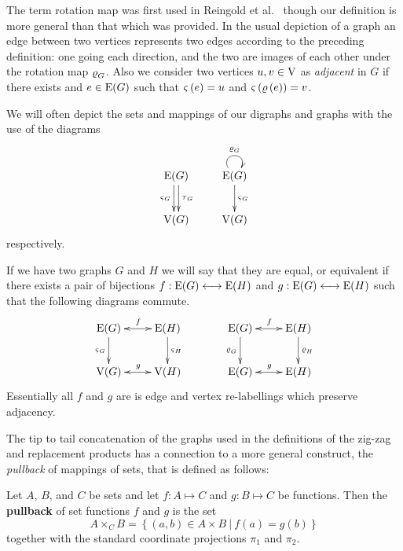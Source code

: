 The term rotation map was first used in Reingold {et al.}~\cite{Reingold:2002ys} though our definition is more general than that which was provided. In the usual depiction of a graph an edge between two vertices represents two edges according to  the preceding definition: one going each direction, and  the two are images of each other under the rotation map $\operatorname{\mathbf{\varrho}}_G$. Also we consider two vertices $u, v \in \mathrm{V}$ as {\em adjacent} in $G$ if there exists and $e \in \mathrm{E}(G) $ such that $\operatorname{\mathbf{\varsigma}}\left(e\right) = u$ and $\operatorname{\mathbf{\varsigma}}\left(\operatorname{\mathbf{\varrho}}\left(e \right)\right) = v$.

We will often depict the sets and mappings of our digraphs and graphs with the use of the diagrams
\[
\xymatrix{ \edgeS{G} \ar@<-.5ex>[d]_{\Source_G} \ar@<+.5ex>[d]^{\Term_G} \\ \vertS{G} } \quad \quad \xymatrix{ \edgeS{G} \ar@(ul,ur)^{\Rot_G} \ar[d]^{\Source_G} \\ \vertS{G} }
\]
respectively.

If we have two graphs $G$ and $H$ we will say that they are equal, or equivalent if there exists a pair of bijections $f:\mathrm{E}(G)  \longleftrightarrow \mathrm{E}(H) $ and $g:\mathrm{E}(G)  \longleftrightarrow \mathrm{E}(H) $ such that the following diagrams commute.
\[
\xymatrix{ \edgeS{G}  \ar[d]_{\Source_G} \ar@{<->}[r]^{f} & \edgeS{H}  \ar[d]^{\Source_H}  \\  \vertS{G} \ar@{<->}[r]^{g} & \vertS{H} } \hspace{.10\textwidth}
\xymatrix{ \edgeS{G}  \ar[d]_{\Rot_G} \ar@{<->}[r]^{f} & \edgeS{H}  \ar[d]^{\Rot_H}  \\  \edgeS{G} \ar@{<->}[r]^{g} & \edgeS{H} }
\]
Essentially all $f$ and $g$ are is edge and vertex re-labellings which preserve adjacency.  

The tip to tail concatenation of the graphs used in the definitions of the zig-zag and replacement products has a connection to a more general construct, the {\em pullback} of mappings of sets, that is defined as follows:

\begin{definition}
\label{definition:pullback:set}
Let $A$, $B$, and $C$ be sets and let $f:A \mapsto C$ and $g:B \mapsto C$ be functions. Then the {\bf pullback} of set  functions $f$ and $g$ is the set \[ A \times_{C} B = \left\{  \left( a, b \right) \in A \times B\  \vert\  f\left(a\right) = g\left(b\right) \right\}  \] together with the standard coordinate projections $\pi_{1}$ and $\pi_{2}$.
\end{definition}

